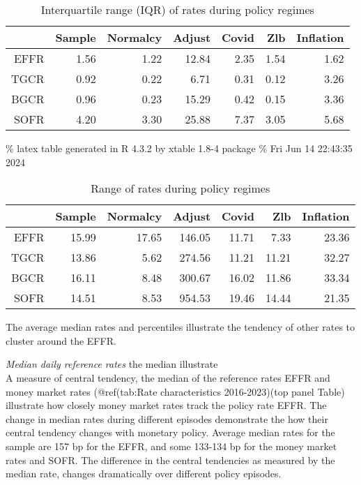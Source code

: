 \documentclass[
]{article}
\begin{document}
\begin{table}[ht]
\centering
\begin{tabular}{rrrrrrr}
  \hline
 & Sample & Normalcy & Adjust & Covid & Zlb & Inflation \\ 
  \hline
EFFR & 1.56 & 1.22 & 12.84 & 2.35 & 1.54 & 1.62 \\ 
  TGCR & 0.92 & 0.22 & 6.71 & 0.31 & 0.12 & 3.26 \\ 
  BGCR & 0.96 & 0.23 & 15.29 & 0.42 & 0.15 & 3.36 \\ 
  SOFR & 4.20 & 3.30 & 25.88 & 7.37 & 3.05 & 5.68 \\ 
   \hline
\end{tabular}
\caption{Interquartile range (IQR) of rates during policy regimes} 
\end{table}

\% latex table generated in R 4.3.2 by xtable 1.8-4 package
\% Fri Jun 14 22:43:35 2024

\begin{table}[ht]
\centering
\begin{tabular}{rrrrrrr}
  \hline
 & Sample & Normalcy & Adjust & Covid & Zlb & Inflation \\ 
  \hline
EFFR & 15.99 & 17.65 & 146.05 & 11.71 & 7.33 & 23.36 \\ 
  TGCR & 13.86 & 5.62 & 274.56 & 11.21 & 11.21 & 32.27 \\ 
  BGCR & 16.11 & 8.48 & 300.67 & 16.02 & 11.86 & 33.34 \\ 
  SOFR & 14.51 & 8.53 & 954.53 & 19.46 & 14.44 & 21.35 \\ 
   \hline
\end{tabular}
\caption{Range of rates during policy regimes} 
\end{table}

The average median rates and percentiles illustrate the tendency of other rates to cluster around the EFFR.

\emph{Median daily reference rates}
the median illustrate\\
A measure of central tendency, the median of the reference rates EFFR and money market rates (@ref(tab:Rate characteristics 2016-2023)(top panel Table) illustrate how closely money market rates track the policy rate EFFR. The change in median rates during different episodes demonstrate the how their central tendency changes with monetary policy. Average median rates for the sample are 157 bp for the EFFR, and some 133-134 bp for the money market rates and SOFR. The difference in the central tendencies as measured by the median rate, changes dramatically over different policy episodes.
\end{document}
